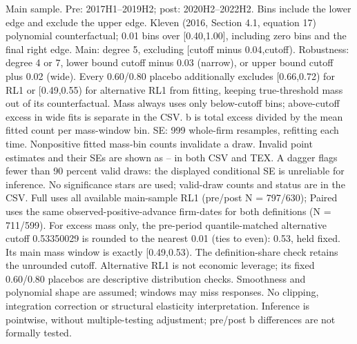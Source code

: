 \begin{threeparttable}
\begin{tablenotes}[flushleft]
\item Main sample. Pre: 2017H1--2019H2; post: 2020H2--2022H2. Bins include the lower edge and exclude the upper edge. Kleven (2016, Section 4.1, equation 17) polynomial counterfactual; 0.01 bins over [0.40,1.00], including zero bins and the final right edge. Main: degree 5, excluding [cutoff minus 0.04,cutoff). Robustness: degree 4 or 7, lower bound cutoff minus 0.03 (narrow), or upper bound cutoff plus 0.02 (wide). Every 0.60/0.80 placebo additionally excludes [0.66,0.72) for RL1 or [0.49,0.55) for alternative RL1 from fitting, keeping true-threshold mass out of its counterfactual. Mass always uses only below-cutoff bins; above-cutoff excess in wide fits is separate in the CSV. b is total excess divided by the mean fitted count per mass-window bin. SE: 999 whole-firm resamples, refitting each time. Nonpositive fitted mass-bin counts invalidate a draw. Invalid point estimates and their SEs are shown as -- in both CSV and TEX. A dagger flags fewer than 90 percent valid draws: the displayed conditional SE is unreliable for inference. No significance stars are used; valid-draw counts and status are in the CSV. Full uses all available main-sample RL1 (pre/post N = 797/630); Paired uses the same observed-positive-advance firm-dates for both definitions (N = 711/599). For excess mass only, the pre-period quantile-matched alternative cutoff 0.53350029 is rounded to the nearest 0.01 (ties to even): 0.53, held fixed. Its main mass window is exactly [0.49,0.53). The definition-share check retains the unrounded cutoff. Alternative RL1 is not economic leverage; its fixed 0.60/0.80 placebos are descriptive distribution checks. Smoothness and polynomial shape are assumed; windows may miss responses. No clipping, integration correction or structural elasticity interpretation. Inference is pointwise, without multiple-testing adjustment; pre/post b differences are not formally tested.
\end{tablenotes}
\end{threeparttable}
